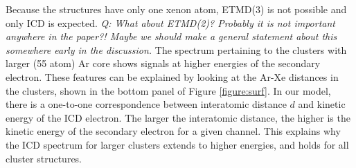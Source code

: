 Because the structures have only one xenon atom, ETMD(3) is not possible
and only ICD is expected. 
{\it Q: What about ETMD(2)? Probably it is not important anywhere in the paper?!
Maybe we should make a general statement about this somewhere early in the discussion.}
The spectrum pertaining to the clusters with larger (55 atom) Ar core shows
signals at higher energies of the secondary electron. These features
can be explained by looking at the Ar-Xe distances in the clusters, shown
in the bottom panel of Figure \ref{figure:surf}. 
In our model, there is a one-to-one correspondence between interatomic distance $d$ and kinetic energy of the ICD electron.
The larger the interatomic distance, the higher is the
kinetic energy of the secondary electron for a given channel.
This explains why the ICD spectrum for larger clusters extends to higher energies, and holds for all cluster structures.

